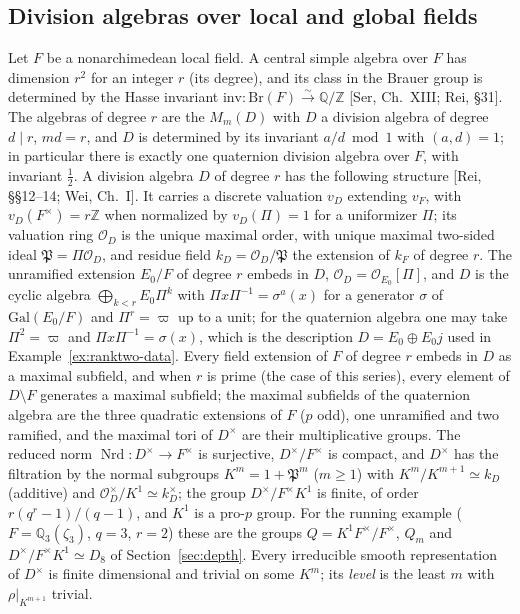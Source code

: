 \documentclass[11pt]{article}
\newcommand{\Z}{\mathbb Z}
\newcommand{\Q}{\mathbb Q}
\newcommand{\Nrd}{\operatorname{Nrd}}
\newcommand{\Ocal}{\mathcal O}
\newcommand{\Pfr}{\mathfrak P}
\theoremstyle{plain}
\theoremstyle{definition}
\begin{document}
\subsection{Division algebras over local and global fields}\label{subsec:divalg}
Let $F$ be a nonarchimedean local field.  A central simple algebra over
$F$ has dimension $r^2$ for an integer $r$ (its degree), and its class in
the Brauer group is determined by the Hasse invariant
$\mathrm{inv}:\mathrm{Br}(F)\xrightarrow{\sim}\Q/\Z$ [Ser, Ch.~XIII; Rei,
\S31].  The algebras of degree $r$ are the $M_m(D)$ with $D$ a division
algebra of degree $d\mid r$, $md=r$, and $D$ is determined by its
invariant $a/d\bmod1$ with $(a,d)=1$; in particular there is exactly one
quaternion division algebra over $F$, with invariant $\tfrac12$.  A
division algebra $D$ of degree $r$ has the following structure
[Rei, \S\S12--14; Wei, Ch.~I].  It carries a discrete valuation $v_D$
extending $v_F$, with $v_D(F^\times)=r\Z$ when normalized by
$v_D(\Pi)=1$ for a uniformizer $\Pi$; its valuation ring $\Ocal_D$ is the
unique maximal order, with unique maximal two-sided ideal
$\Pfr=\Pi\Ocal_D$, and residue field $k_D=\Ocal_D/\Pfr$ the extension of
$k_F$ of degree $r$.  The unramified extension $E_0/F$ of degree $r$
embeds in $D$, $\Ocal_D=\Ocal_{E_0}[\Pi]$, and $D$ is the cyclic algebra
$\bigoplus_{k<r}E_0\Pi^k$ with $\Pi x\Pi^{-1}=\sigma^a(x)$ for a
generator $\sigma$ of $\mathrm{Gal}(E_0/F)$ and $\Pi^r=\varpi$ up to a
unit; for the quaternion algebra one may take $\Pi^2=\varpi$ and
$\Pi x\Pi^{-1}=\sigma(x)$, which is the description
$D=E_0\oplus E_0j$ used in Example~\ref{ex:ranktwo-data}.  Every field
extension of $F$ of degree $r$ embeds in $D$ as a maximal subfield, and
when $r$ is prime (the case of this series), every element of
$D\setminus F$ generates a maximal subfield; the
maximal subfields of the quaternion algebra are the three quadratic
extensions of $F$ ($p$ odd), one unramified and two ramified, and the
maximal tori of $D^\times$ are their multiplicative groups.  The reduced
norm $\Nrd:D^\times\to F^\times$ is surjective, $D^\times/F^\times$ is
compact, and $D^\times$ has the filtration by the normal subgroups
$K^m=1+\Pfr^m$ ($m\ge1$) with $K^m/K^{m+1}\simeq k_D$ (additive) and
$\Ocal_D^\times/K^1\simeq k_D^\times$; the group $D^\times/F^\times K^1$
is finite, of order $r(q^r-1)/(q-1)$, and $K^1$ is a pro-$p$ group.  For
the running example ($F=\Q_3(\zeta_3)$, $q=3$, $r=2$) these are the
groups $Q=K^1F^\times/F^\times$, $Q_m$ and $D^\times/F^\times K^1\simeq D_8$
of Section~\ref{sec:depth}.  Every irreducible smooth representation of
$D^\times$ is finite dimensional and trivial on some $K^m$; its
\emph{level} is the least $m$ with $\rho|_{K^{m+1}}$ trivial.
\end{document}
